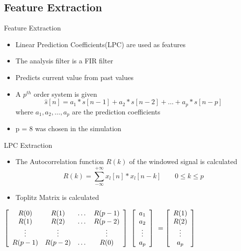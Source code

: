 \documentclass{beamer}
\begin{document}
\subsection{Feature Extraction}

\begin{frame}{Feature Extraction}
\begin{itemize}
    \item Linear Prediction Coefficients(LPC) are used as features
    \item The analysis filter is a FIR filter
    \item Predicts current value from past values
    \item A $p^{th}$ order system is given
    \begin{equation}
        \hat{s}[n] = a_1*s[n-1] + a_2*s[n-2] +\dots+ a_p*s[n-p]
    \end{equation}
    where $a_1,a_2,\dots,a_p$ are the prediction coefficients
    \item p = 8 was chosen in the simulation 
\end{itemize}
\end{frame}

\begin{frame}{LPC Extraction}
\begin{itemize}
    \item The Autocorrelation function $R(k)$ of the windowed signal is calculated
    \begin{equation}
        R(k) = \sum_{-\infty}^{+\infty} x_l[n]*x_l[n-k] \qquad 0 \leq k\leq p
    \end{equation}
    \item Toplitz Matrix is calculated
\end{itemize}

\begin{math}
\left[\begin{array}{c c c c}
R(0) &R(1) &\dots &R(p-1) \\ 
R(1) &R(2) &\dots &R(p-2) \\
\vdots &\vdots & &\vdots \\
R(p-1) &R(p-2) &\dots &R(0) 
\end{array}\right]
~
\left[\begin{array}{c}
a_1 \\ 
a_2  \\
\vdots \\
a_p 
\end{array}\right]
~ =
\left[\begin{array}{c}
R(1) \\ 
R(2)  \\
\vdots \\
a_p 
\end{array}\right]
\end{math}



\end{frame}
\end{document}

